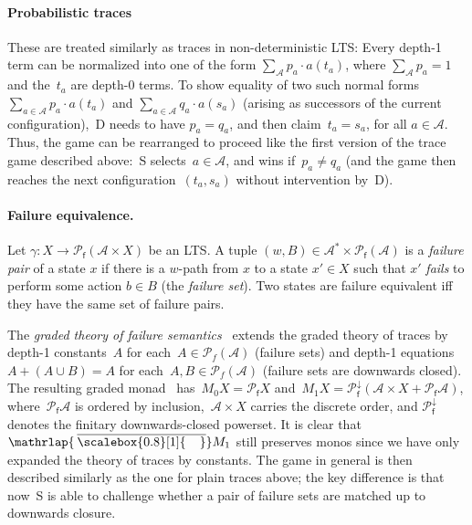 \documentclass[sigconf,
			final%
			nonacm
                        ]{acmart}
\numberwithin{equation}{section}
\numberwithin{equation}{section}
\theoremstyle{plain}
\theoremstyle{definition}
\newcommand{\mybar}[3]{%
  \mathrlap{\hspace{#2}\overline{\scalebox{#1}[1]{\hphantom{\ensuremath{#3}}\vphantom{\rule{0pt}{5.5pt}}}}}\ensuremath{#3}
}
\newcommand{\barM}{\mybar{0.8}{2pt}{M}_1}
\newcommand{\A}{\mathcal{A}}            %
\newcommand{\pow}{\mathscr P}              %
\newcommand{\powf}{\pow_{\mathsf f}}
\begin{document}
\paragraph*{Probabilistic traces} These are treated similarly as traces in
non-deterministic LTS: Every depth-1 term can be normalized into one
of the form
 $ \sum_{\A} p_a\cdot a(t_a)$,
where $\sum_{\A}p_a=1$ and the~$t_a$ are depth-0 terms. To show
equality of two such normal forms $\sum_{a\in\A} p_a\cdot a(t_a)$ and
$\sum_{a\in\A} q_a\cdot a(s_a)$ (arising as successors of the current
configuration),~D needs to have $p_a=q_a$, and then claim~$t_a=s_a$,
for all $a\in\A$. Thus, the game can be rearranged to proceed like the
first version of the trace game described above:~S selects~$a\in\A$,
and wins if~$p_a\neq q_a$ (and the game then reaches the next
configuration~$(t_a,s_a)$ without intervention by~D).

\paragraph*{Failure equivalence.}
Let $\gamma\colon X \to \powf(\A \times X)$ be an LTS.
A tuple $(w,B)\in \A^* \times \powf(\A)$ is a \emph{failure pair} of a state $x$ if there is a $w$-path from $x$ to a state $x'\in X$
such that $x'$ \emph{fails} to perform some action $b\in B$ (the
\emph{failure set}). Two states are failure equivalent iff
they have the same set of failure pairs.

The \emph{graded theory of failure semantics}~\cite{DMS19}
extends the graded theory of traces by de\-pth-1 constants~$A$ for
each~$A\in\pow_f(\A)$ (failure sets) and depth-1
equations~$A+ (A\cup B) = A$ for each~$A,B\in\pow_f(\A)$
(failure sets are downwards closed). The resulting graded monad~\cite{DMS19}
has~$M_0X=\powf X$ and~${M_1X=\powf^\downarrow(\A\times X + \powf \A)}$,
where~$\powf \A$ is ordered by inclusion,~$\A\times X$ carries the discrete order, and
$\powf^\downarrow$ denotes the finitary downwards-closed powerset.
It is clear that $\barM$ still preserves monos since we have only expanded
the theory of traces by constants. The game in general
is then described similarly as the one for plain traces above; the key
difference is that now~S is able to challenge whether a pair of failure
sets are matched up to downwards closure.
\end{document}
